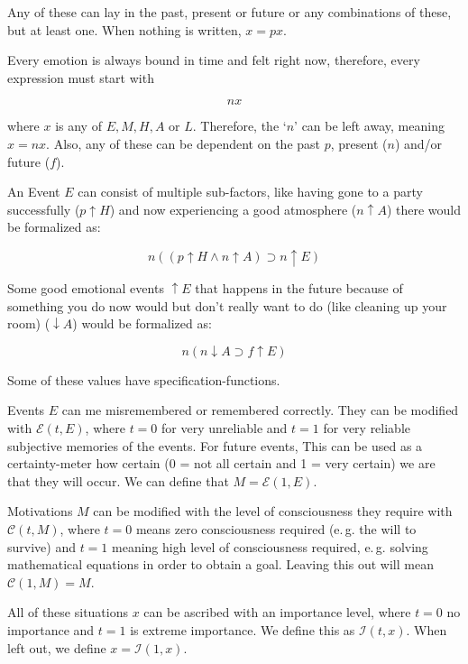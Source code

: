 \documentclass{scrartcl}
\begin{document}
Any of these can lay in the past, present or future or any combinations of these, but at least one. When nothing is written, $x = p x$. 

Every emotion is always bound in time and felt right now, therefore, every expression must start with

\begin{equation} n x \end{equation}

where $x$ is any of $E, M, H, A$ or $L$. Therefore, the `$n$' can be left away, meaning $x = n x$. Also, any of these can
be dependent on the past $p$, present ($n$) and/or future ($f$).

An Event $E$ can consist of multiple sub-factors, like having gone to a party successfully ($p \uparrow H$) and now experiencing a good atmosphere ($n \uparrow A$) 
there would be formalized as:

\begin{equation} n \left(
		\left(
			p \uparrow H \wedge n \uparrow A
		\right)
		\supset n \uparrow E 
	\right)
\end{equation}

Some good emotional events $\uparrow E$ that happens in the future because of something you do now would but don't really want to do (like cleaning up
your room) ($\downarrow A$) would be formalized as:

\begin{equation} n \left(
		n \downarrow A \supset f \uparrow E
	\right)
\end{equation}

Some of these values have specification-functions.

Events $E$ can me misremembered or remembered correctly. They can be modified with $\mathcal{E}(t, E)$, where $t = 0$ for very unreliable and
$t = 1$ for very reliable subjective memories of the events. For future events, This can be used as a certainty-meter how certain (0 = not all certain
and 1 = very certain) we are that they will occur. We can define that $M = \mathcal{E}(1, E)$.

Motivations $M$ can be modified with the level of consciousness they require with $\mathcal{C}(t, M)$, where $t = 0$ means zero consciousness required
(e.\,g. the will to survive) and $t = 1$ meaning high level of consciousness required, e.\,g. solving mathematical equations in order to obtain a goal.
Leaving this out will mean $\mathcal{C}(1, M) = M$.

All of these situations $x$ can be ascribed with an importance level, where $t = 0$ no importance and $t = 1$ is extreme importance. We define this as
$\mathcal{I}(t, x)$. When left out, we define $x = \mathcal{I}(1, x)$.
\end{document}
